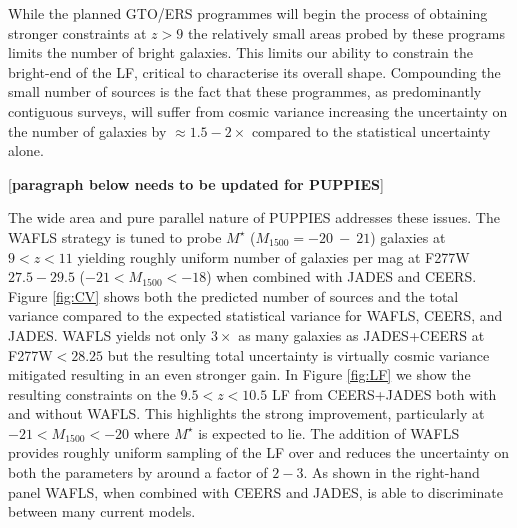 \documentclass[12pt]{article}
\begin{document}
While the planned GTO/ERS programmes will begin the process of obtaining stronger constraints at $z>9$ the relatively small areas probed by these programs limits the number of bright galaxies. This limits our ability to constrain the bright-end of the LF, critical to characterise its overall shape. Compounding the small number of sources is the fact that these programmes, as predominantly contiguous surveys, will suffer from cosmic variance increasing the uncertainty on the number of galaxies by $\approx 1.5-2\times$ compared to the statistical uncertainty alone\cite{2020MNRAS.499.2401T}\cite{2020MNRAS.496..754B}\cite{2008ApJ...676..767T}. 

[{\bf paragraph below needs to be updated for PUPPIES}]

The wide area and pure parallel nature of PUPPIES addresses these issues. The WAFLS strategy is tuned to probe $M^{\star}$ ($M_{1500}=-20\ -\ 21$) galaxies at $9<z<11$ yielding roughly uniform number of galaxies per mag at F277W$27.5-29.5$ ($-21<M_{1500}<-18$) when combined with JADES and CEERS. Figure \ref{fig:CV} shows both the predicted number of sources and the total variance compared to the expected statistical variance for WAFLS, CEERS, and JADES. WAFLS yields not only $3\times$ as many galaxies as JADES+CEERS at F277W$<28.25$ but the resulting total uncertainty is virtually cosmic variance mitigated resulting in an even stronger gain. In Figure \ref{fig:LF} we show the resulting constraints on the $9.5<z<10.5$ LF from CEERS+JADES both with and without WAFLS. This highlights the strong improvement, particularly at $-21<M_{1500}<-20$ where $M^{\star}$ is expected to lie. The addition of WAFLS provides roughly uniform sampling of the LF over and reduces the uncertainty on both the parameters by around a factor of $2-3$. As shown in the right-hand panel WAFLS, when combined with CEERS and JADES, is able to discriminate between many current models. 








\end{document}
